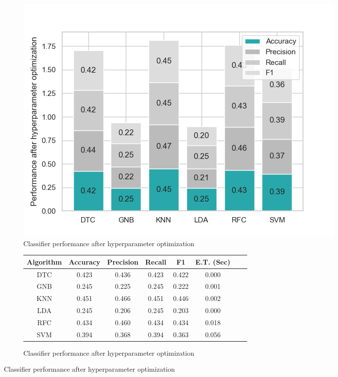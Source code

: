 \documentclass[conference,onecolumn]{IEEEtran}
\begin{document}
        \begin{figure}[H]
            \centering
            \begin{subfigure}{0.45\textwidth}
                \centering
                \includegraphics[width=\linewidth]{Plots/Performance_after_dimensionality_reduction_and_HP_optimization.png}
                \caption{Classifier performance after hyperparameter optimization}
                \label{fig:performanceAfterHyperparameterOptimization}
            \end{subfigure}%
            \begin{subfigure}{0.55\textwidth}
                \centering
                \small
                \begin{tabular}{|c|c|c|c|c|c|c|c|}
                    \hline
                        \textbf{Algorithm} &\textbf{Accuracy} &\textbf{Precision} &\textbf{Recall} &\textbf{F1} &\textbf{E.T. (Sec)} \\ \hline
                        \hline
                        DTC    & 0.423   & 0.436   & 0.423  & 0.422   & 0.000  \\ \hline
                        GNB    & 0.245   & 0.225   & 0.245  & 0.222   & 0.001  \\ \hline
                        KNN    & 0.451   & 0.466   & 0.451  & 0.446   & 0.002  \\ \hline
                        LDA    & 0.245   & 0.206   & 0.245  & 0.203   & 0.000  \\ \hline
                        RFC    & 0.434   & 0.460   & 0.434  & 0.434   & 0.018  \\ \hline
                        SVM    & 0.394   & 0.368   & 0.394  & 0.363   & 0.056  \\
                    \hline
                \end{tabular}
                \caption{Classifier performance after hyperparameter optimization}
                \label{table:hyperparameterOptimizationResults}
            \end{subfigure}
        \end{figure}
        
\end{document}

